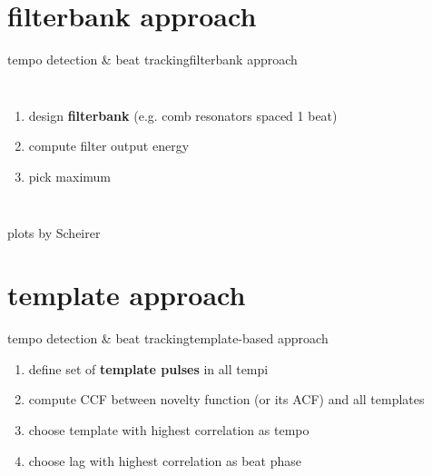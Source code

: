     \section{filterbank approach}
        \begin{frame}{tempo detection \& beat tracking}{filterbank approach}
            \begin{columns}[T]
                \begin{enumerate}
                    \item	design \textbf{filterbank} (e.g. comb resonators spaced 1 beat)
                    \smallskip
                    \item<2->	compute filter output energy	
                    \smallskip
                    \item<3->	pick maximum
                \end{enumerate}
            \end{columns}
            plots by Scheirer
        \end{frame}

    \section{template approach}
        \begin{frame}{tempo detection \& beat tracking}{template-based approach}
            \begin{enumerate}
                \item	define set of \textbf{template pulses} in all tempi
                \smallskip
                \item<1->	compute CCF between novelty function (or its ACF) and all templates
                \smallskip
                \item<1->	choose template with highest correlation as tempo
                \smallskip
                \item<1->	choose lag with highest correlation as beat phase
            \end{enumerate}
        \end{frame}

